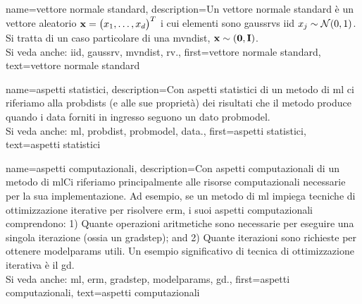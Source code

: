 {name={vettore normale standard}, 
	description={Un vettore normale standard è un vettore aleatorio  ${\bf x}=\big(x_{1},\ldots,x_{d}\big)^{T}$ 
		i cui elementi sono \glspl{gaussrv} \gls{iid} $x_{j} \sim \mathcal{N}(0,1)$. 
		Si tratta di un caso particolare di una \gls{mvndist}, ${\bf x} \sim \mathcal(\mathbf{0},\mathbf{I})$.
		\\ 
		Si veda anche: \gls{iid}, \gls{gaussrv}, \gls{mvndist}, \gls{rv}.}, 
	first={vettore normale standard},
	text={vettore normale standard}
}

{name={aspetti statistici}, 
	description={Con aspetti statistici 
		di un metodo di \gls{ml} ci riferiamo alla \glspl{probdist} (e alle sue proprietà) dei risultati che il metodo 
		produce quando i \gls{data} forniti in ingresso seguono un dato \gls{probmodel}.					
		\\ 
		Si veda anche: \gls{ml}, \gls{probdist}, \gls{probmodel}, \gls{data}.},
	first={aspetti statistici},
	text={aspetti statistici}
}

{name={aspetti computazionali}, 
	description={Con aspetti computazionali di un metodo di \gls{ml}Ci riferiamo principalmente alle 
	risorse computazionali necessarie per la sua implementazione. Ad esempio, se un metodo di \gls{ml} impiega tecniche di 
	ottimizzazione iterative per risolvere \gls{erm}, i suoi aspetti computazionali comprendono: 1) Quante 
	operazioni aritmetiche sono necessarie per eseguire una singola iterazione (ossia un \gls{gradstep}); 
		and 2) Quante iterazioni sono richieste per ottenere \glspl{modelparam} utili. Un esempio 
		significativo di tecnica di ottimizzazione iterativa è il \gls{gd}.
					\\ 
		Si veda anche: \gls{ml}, \gls{erm}, \gls{gradstep}, \glspl{modelparam}, \gls{gd}.}, 
	first={aspetti computazionali},
	text={aspetti computazionali}
}


